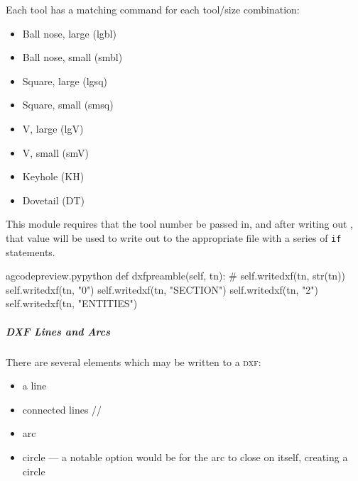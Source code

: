 \documentclass{ltxdoc}
\begin{document}
Each tool has a matching command for each tool/size combination:

\begin{itemize}
\item Ball nose, large (lgbl) 
\item Ball nose, small (smbl) 
\item Square, large (lgsq) 
\item Square, small (smsq) 
\item V, large (lgV) 
\item V, small (smV) 
\item Keyhole (KH) 
\item Dovetail (DT) 
\end{itemize}
 

This module requires that the tool number be passed in, and after writing out , that value will be used to write out to the appropriate file with a series of \texttt{if} statements.
 
\lstset{firstnumber=\thegcpy}
\begin{writecode}{a}{gcodepreview.py}{python}
    def dxfpreamble(self, tn):
#        self.writedxf(tn, str(tn))
        self.writedxf(tn, "0")
        self.writedxf(tn, "SECTION")
        self.writedxf(tn, "2")
        self.writedxf(tn, "ENTITIES")

\end{writecode}
\addtocounter{gcpy}{7}


\subparagraph{DXF Lines and Arcs}%
 
There are several elements which may be written to a \textsc{dxf}:

\begin{itemize}
 \item a line %
 \item connected lines //
 \item arc 
 \item circle --- a notable option would be for the arc to close on itself, creating a circle 
\end{itemize}
 
\end{document}

